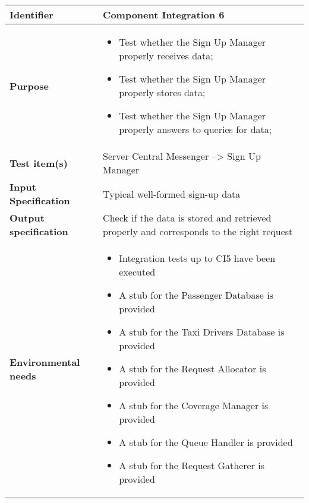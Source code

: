 \begin{center}
\begin{tabular}{lp{}}
\toprule
\textbf{Identifier}		&	Component Integration 6\\
\midrule
\textbf{Purpose}		&	\begin{itemize}
					\item Test whether the Sign Up Manager properly receives data;
					\item Test whether the Sign Up Manager properly stores data;
					\item Test whether the Sign Up Manager properly answers to queries for data;
					\end{itemize}	\\
\textbf{Test item(s)}	&	Server Central Messenger --> Sign Up Manager\\
\textbf{Input Specification}	&	Typical well-formed sign-up data\\
\textbf{Output specification}	&	Check if the data is stored and retrieved properly and corresponds to the right request\\
\textbf{Environmental needs}	&	\begin{itemize}
							\item Integration tests up to CI5 have been executed
							\item A stub for the Passenger Database is provided
							\item A stub for the Taxi Drivers Database is provided											\item A stub for the Request Allocator is provided
							\item A stub for the Coverage Manager is provided
							\item A stub for the Queue Handler is provided
							\item A stub for the Request Gatherer is provided
							\end{itemize}	\\
\bottomrule
\end{tabular}
\end{center}



